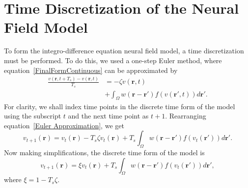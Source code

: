 \documentclass[5p,authoryear]{elsarticle}
\begin{document}
\section{Time Discretization of the Neural Field Model}
\label{App:Time Discretization} To form the integro-difference equation neural field model, a time discretization must be performed. To do this, we used a one-step Euler method, where equation~\ref{FinalFormContinuous} can be approximated by 
\begin{align}
	\label{Euler Approximation}\frac{v\left( \mathbf{r},t+T_s \right) - v\left( \mathbf{r},t\right)}{T_s} &=-\zeta v\left( \mathbf{r},t \right) \nonumber \\ 
&+ \int_\Omega {w\left( \mathbf{r}-\mathbf{r}' \right)f\left( {v\left( \mathbf{r}',t \right)} \right)d\mathbf{r}'}. 
\end{align}
For clarity, we shall index time points in the discrete time form of the model using the subscript $t$ and the next time point as $t+1$. Rearranging equation~\ref{Euler Approximation}, we get 
\begin{equation}
	\label{Euler Approximation2} v_{t+1}\left( \mathbf{r}\right) = v_t\left( \mathbf{r}\right) -T_s \zeta v_t\left( \mathbf{r}\right) + T_s \int_\Omega {w\left( \mathbf{r}-\mathbf{r}' \right)f\left( {v_t\left( \mathbf{r}'\right)} \right)d\mathbf{r}'}. 
\end{equation}
Now making simplifications, the discrete time form of the model is 
\begin{equation}
	\label{Discrete Time Model1}v_{t+1}\left(\mathbf{r}\right) = \xi v_t\left(\mathbf{r}\right) + T_s \int_\Omega { w\left(\mathbf{r}-\mathbf{r}'\right) f\left(v_t\left(\mathbf{r}'\right)\right) d\mathbf{r}'}, 
\end{equation}
where $\xi = 1 - T_s \zeta$.
\end{document}
